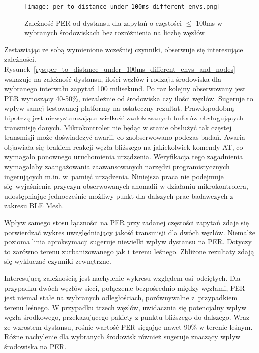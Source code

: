 \begin{figure}[!htb]
	\centering \texttt{[image: per\_to\_distance\_under\_100ms\_different\_envs.png]} 
	\caption{Zależność \gls{PER} od dystansu dla zapytań o częstości $\leqslant$ 100ms w wybranych środowiskach bez rozróżnienia na liczbę węzłów}
	\label{rys:per_to_distance_under_100ms_different_envs}
\end{figure}

Zestawiając ze sobą wymienione wcześniej czynniki, obserwuje się interesujące zależności. Rysunek~\ref{rys:per_to_distance_under_100ms_different_envs_and_nodes} wskazuje na zależność dystansu, ilości węzłów i rodzaju
środowiska dla wybranego interwału zapytań 100 milisekund. Po raz kolejny obserwowany jest PER wynoszący
40-50\%, niezależnie od środowiska czy ilości węzłów. Sugeruje to wpływ samej testowanej platformy
na ostateczny rezultat. Prawdopodobną hipotezą jest niewystarczająca wielkość zaalokowanych
buforów obsługujących transmisję danych. Mikrokontroler nie będąc w stanie obsłużyć tak częstej transmisji
może doświadczyć awarii, co zaobserwowano podczas badań. Awaria objawiała się brakiem reakcji węzła bliższego
na jakiekolwiek komendy AT, co wymagało ponownego uruchomienia urządzenia. Weryfikacja tego zagadnienia
wymagałaby zaangażowania zaawansowanych narzędzi programistycznych ingerujących m.in. w~pamięć urządzenia.
Niniejsza praca nie podejmuje się wyjaśnienia przyczyn obserwowanych anomalii w działaniu mikrokontrolera,
udostępniając jednocześnie możliwy punkt dla dalszych prac badawczych z zakresu BLE Mesh.

Wpływ samego stosu łączności na PER przy zadanej częstości zapytań zdaje się potwierdzać wykres uwzględniający
jakość transmisji dla dwóch węzłów. Niemalże pozioma linia aproksymacji sugeruje niewielki wpływ dystansu na PER.
Dotyczy to zarówno terenu zurbanizowanego jak i~terenu leśnego. Zbliżone rezultaty zdają się wykluczać
czynniki zewnętrzne.

Interesującą zależnością jest nachylenie wykresu względem osi odciętych. Dla przypadku dwóch węzłów sieci,
połączenie bezpośrednio między węzłami, PER jest niemal stałe na wybranych odległościach, porównywalne
z~przypadkiem terenu leśnego. W przypadku trzech
węzłów, uwidacznia się potencjalny wpływ węzła środkowego, przekazującego pakiety z punktu bliższego do
dalszego. Wraz ze wzrostem dystansu, rośnie wartość PER sięgając nawet 90\% w terenie leśnym. Różne nachylenie
dla wybranych środowisk również sugeruje znaczący wpływ środowiska na PER.

